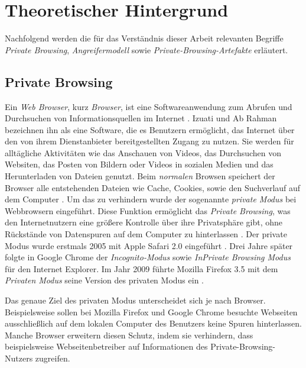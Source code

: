 \chapter{Theoretischer Hintergrund}\label{chap:theorie}

Nachfolgend werden die für das Verständnis dieser Arbeit relevanten Begriffe \textit{Private Browsing}, \textit{Angreifermodell} sowie \textit{Private-Browsing-Artefakte} erläutert.

\section{Private Browsing}\label{chap:theorie-private-browsing}

Ein \textit{Web Browser}, kurz \textit{Browser}, ist eine Softwareanwendung zum Abrufen und Durchsuchen von Informationsquellen im Internet \cite{Rochmadi.2017}. Izuati und Ab Rahman \cite{Izzati.2022} bezeichnen ihn als eine Software, die es Benutzern ermöglicht, das Internet über den von ihrem Dienstanbieter bereitgestellten Zugang zu nutzen. Sie werden für alltägliche Aktivitäten wie das Anschauen von Videos, das Durchsuchen von Websiten, das Posten von Bildern oder Videos in sozialen Medien und das Herunterladen von Dateien genutzt. \cite{Izzati.2022}
Beim \textit{normalen} Browsen speichert der Browser alle entstehenden Dateien wie Cache, Cookies, sowie den Suchverlauf auf dem Computer \cite{Izzati.2022}. Um das zu verhindern wurde der sogenannte \textit{private Modus} bei Webbrowsern eingeführt. Diese Funktion ermöglicht das \textit{Private Browsing}, was den Internetnutzern eine größere Kontrolle über ihre Privatsphäre gibt, ohne Rückstände von Datenspuren auf dem Computer zu hinterlassen \cite{Said.2011}. Der private Modus wurde erstmals 2005 mit Apple Safari 2.0 eingeführt \cite{Said.2011}. Drei Jahre später folgte in Google Chrome der \textit{Incognito-Modus} sowie \textit{InPrivate Browsing Modus} für den Internet Explorer. Im Jahr 2009 führte Mozilla Firefox 3.5 mit dem \textit{Privaten Modus} seine Version des privaten Modus ein \cite{Montasari.2015}.

Das genaue Ziel des privaten Modus unterscheidet sich je nach Browser. Beispielsweise sollen bei Mozilla Firefox und Google Chrome besuchte Webseiten ausschließlich auf dem lokalen Computer des Benutzers keine Spuren hinterlassen. \cite{MozillaWiki.05.06.2023,GoogleChrome.} Manche Browser erweitern diesen Schutz, indem sie verhindern, dass beispielsweise Webseitenbetreiber auf Informationen des Private-Browsing-Nutzers zugreifen. \cite{Tor.24.05.2023}

